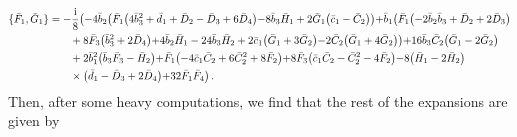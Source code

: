 \documentclass[10pt]{amsart}
\theoremstyle{definition}
\theoremstyle{corollary}
\theoremstyle{remark}
\theoremstyle{conclusion}
\begin{document}
\begin{align}
    \{\bar{F}_1, \bar{G}_1\}&=-\frac{\rm i}{8}  \bigl(-4 \bar{b}_2 \bigl(\bar{F}_1 \bigl(4 \bar{b}_3^2+\bar{d}_1+\bar{D}_2-\bar{D}_3+6 \bar{D}_4\bigl)-8 \bar{b}_3 \bar{H}_1+2 \bar{G}_1 \bigl(\bar{c}_1-\bar{C}_2\bigl)\bigl)+\bar{b}_1 \bigl(\bar{F}_1 \bigl(-2 \bar{b}_2 \bar{b}_3+\bar{D}_2+2 \bar{D}_3\bigl) \nonumber \\
&\hskip 0.7cm+8 \bar{F}_3 \bigl(\bar{b}_3^2+2 \bar{D}_4\bigl)+4 \bar{b}_2 \bar{H}_1-24 \bar{b}_3 \bar{H}_2+2 \bar{c}_1 \bigl(\bar{G}_1+3 \bar{G}_2\bigl)-2 \bar{C}_2 \bigl(\bar{G}_1+4 \bar{G}_2\bigl)\bigl)+16 \bar{b}_3 \bar{C}_2 \bigl(\bar{G}_1-2 \bar{G}_2\bigl)  \nonumber \\
&	\hskip 0.7cm+2 \bar{b}_1^2 \bigl(\bar{b}_3 \bar{F}_3-\bar{H}_2\bigl)+\bar{F}_1 \bigl(-4 \bar{c}_1 \bar{C}_2+6 \bar{C}_2^2+8 \bar{F}_2\bigl)+8 \bar{F}_3 \bigl(\bar{c}_1 \bar{C}_2-\bar{C}_2^2-4 \bar{F}_2\bigl)-8 \bigl(\bar{H}_1-2 \bar{H}_2\bigl) \nonumber \\
&	\hskip 0.7cm \times	\bigl(\bar{d}_1-\bar{D}_3+2 \bar{D}_4\bigl)+32 \bar{F}_1 \bar{F}_4\bigl) \, .
\end{align}  Then, after some heavy computations, we find that the rest of the expansions are given by 
\end{document}
